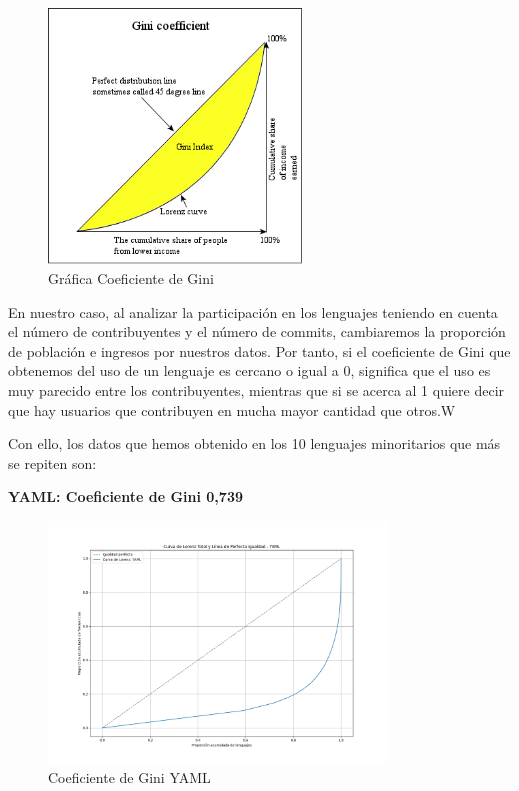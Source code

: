 \documentclass[a4paper, 12pt]{book}
\begin{document}
\begin{itemize}
\begin{itemize}
          \begin{figure}[H]
            \centering
            \includegraphics[width=0.6\textwidth]{img/graficagini.png}
            \caption{Gráfica Coeficiente de Gini}
            \label{figura:ginigrafica}
          \end{figure}

          En nuestro caso, al analizar la participación en los lenguajes teniendo en cuenta el número de contribuyentes y el número de commits, cambiaremos la proporción de población e ingresos por nuestros datos. Por tanto, si el coeficiente de Gini que obtenemos del uso de un lenguaje es cercano o igual a 0, significa que el uso es muy parecido entre los contribuyentes, mientras que si se acerca al 1 quiere decir que hay usuarios que contribuyen en mucha mayor cantidad que otros.W

          Con ello, los datos que hemos obtenido en los 10 lenguajes minoritarios que más se repiten son:

          \textbf{YAML: Coeficiente de Gini 0,739}

          \begin{figure}[H]
            \centering
            \includegraphics[width=0.8\textwidth]{img/curva_lorenz_total_YAML.png}
            \caption{Coeficiente de Gini YAML}
            \label{figura:ginigraficaYAML}
          \end{figure}


\end{itemize}
\end{itemize}
\end{document}
